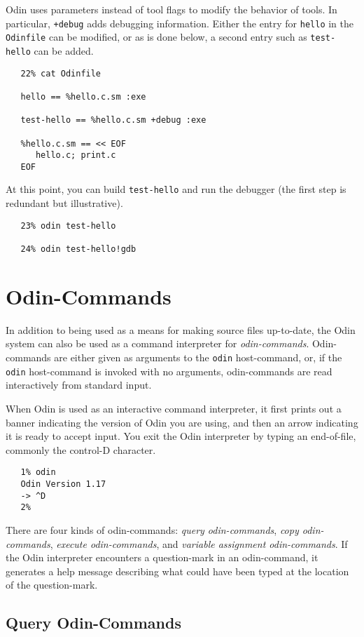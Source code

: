 \documentclass[hidelinks]{report}
\newcommand{\ex}{\tt}   %
\begin{document}
Odin uses parameters instead of tool flags to modify the behavior of tools.
In particular, {\ex +debug} adds debugging information.
Either the entry for {\ex hello} in the {\ex Odinfile} can be modified,
or as is done below, a second entry such as {\ex test-hello} can be added.
\begin{verbatim}
   22% cat Odinfile

   hello == %hello.c.sm :exe

   test-hello == %hello.c.sm +debug :exe

   %hello.c.sm == << EOF
      hello.c; print.c
   EOF
\end{verbatim}
At this point, you can build {\ex test-hello} and run the debugger (the first step is redundant but illustrative).
\begin{verbatim}
   23% odin test-hello

   24% odin test-hello!gdb
\end{verbatim}



\chapter{Odin-Commands}
\label{command}


In addition to being used as a means for making source files up-to-date,
the Odin system can also be used as a command interpreter for
{\em odin-commands}.
Odin-commands are either given as arguments to the {\ex odin} host-command,
or, if the {\ex odin} host-command is invoked with no arguments, 
odin-commands are read interactively from standard input.

When Odin is used as an interactive command interpreter,
it first prints out a banner indicating the version of Odin you are using,
and then an arrow indicating it is ready to accept input.
You exit the Odin interpreter by typing an end-of-file,
commonly the control-D character.
\begin{verbatim}
   1% odin
   Odin Version 1.17
   -> ^D
   2%
\end{verbatim}

There are four kinds of odin-commands: {\em query odin-commands},
{\em copy odin-commands}, {\em execute odin-commands},
and {\em variable assignment odin-commands}.
If the Odin interpreter encounters a question-mark in an odin-command,
it generates a help message describing what could have been
typed at the location of the question-mark.


\section{Query Odin-Commands}
\label{query}
\end{document}
